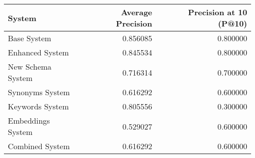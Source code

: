 \begin{tabular}{lrr}
\toprule
System & Average Precision & Precision at 10 (P@10) \\
\midrule
Base System & 0.856085 & 0.800000 \\
Enhanced System & 0.845534 & 0.800000 \\
New Schema System & 0.716314 & 0.700000 \\
Synonyms System & 0.616292 & 0.600000 \\
Keywords System & 0.805556 & 0.300000 \\
Embeddings System & 0.529027 & 0.600000 \\
Combined System & 0.616292 & 0.600000 \\
\bottomrule
\end{tabular}

